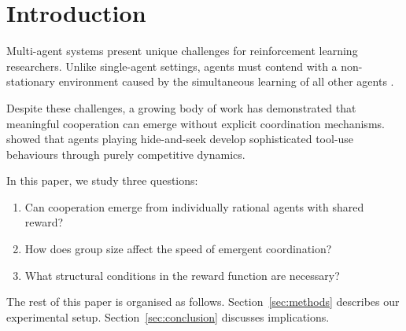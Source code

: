 \section{Introduction}
\label{sec:introduction}

Multi-agent systems present unique challenges for reinforcement learning researchers.
Unlike single-agent settings, agents must contend with a non-stationary environment
caused by the simultaneous learning of all other agents \cite{sutton2018reinforcement}.

Despite these challenges, a growing body of work has demonstrated that meaningful
cooperation can emerge without explicit coordination mechanisms. \citet{baker2019emergent}
showed that agents playing hide-and-seek develop sophisticated tool-use behaviours
through purely competitive dynamics.

In this paper, we study three questions:
\begin{enumerate}
  \item Can cooperation emerge from individually rational agents with shared reward?
  \item How does group size affect the speed of emergent coordination?
  \item What structural conditions in the reward function are necessary?
\end{enumerate}

The rest of this paper is organised as follows. Section~\ref{sec:methods} describes
our experimental setup. Section~\ref{sec:conclusion} discusses implications.
